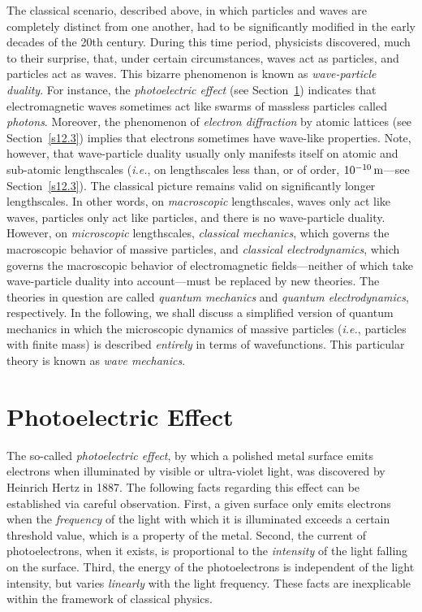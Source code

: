 The classical scenario, described above, in which particles and waves are completely distinct from one another, had to be
significantly modified  in the early decades of the 20th century.
During this time period, physicists discovered, much to their surprise, that, under certain circumstances, waves
 act as particles, and particles act as waves. This bizarre phenomenon is known as
{\em wave-particle duality}. For instance, the {\em photoelectric effect}\/ (see Section~\ref{s12.2}) indicates that
electromagnetic waves  sometimes act like swarms of massless particles called {\em photons}. Moreover, the phenomenon of {\em electron diffraction}\/ by atomic lattices (see Section~\ref{s12.3})
implies that electrons  sometimes have wave-like properties.  Note, however, that wave-particle
duality usually only manifests itself on atomic and sub-atomic lengthscales ({\em i.e.}, on lengthscales less than,
or of order, 
$10^{-10}\,{\rm m}$---see Section~\ref{s12.3}).  The classical picture remains valid on significantly longer lengthscales. In other words,
on {\em macroscopic}\/ lengthscales,  
  waves only act like waves, particles only act like particles, and there is no wave-particle duality.  However, on
  {\em microscopic}\/ lengthscales, {\em classical mechanics}, which governs the macroscopic behavior of massive particles, and
{\em classical electrodynamics}, which governs the macroscopic behavior of electromagnetic fields---neither of
which take wave-particle duality into account---must be replaced by new theories. The theories in question are called {\em quantum mechanics}\/ and {\em quantum electrodynamics},
respectively. In the following, we shall discuss a simplified version of quantum mechanics in which the microscopic  dynamics of
 massive particles ({\em i.e.}, particles with finite mass) is described
 {\em entirely}\/ in terms of  wavefunctions. This
 particular 
theory is known as {\em wave mechanics}.  

\section{Photoelectric Effect}\label{s12.2}
The so-called {\em photoelectric effect}, by which a polished metal surface emits electrons
when illuminated by visible or ultra-violet light, was discovered by Heinrich Hertz in 1887.
The following facts regarding this effect can be established via careful
observation. First, a given surface only emits electrons when the {\em frequency}\/
of the light with which it is illuminated exceeds a certain threshold value,
which is a property of the metal. Second, the current of photoelectrons, when it
exists, is proportional to the {\em intensity}\/ of the light falling on the surface. 
Third, the energy of the photoelectrons is independent of the light intensity,
but varies {\em linearly}\/ with the light frequency. These facts are
inexplicable within the framework of classical physics.

